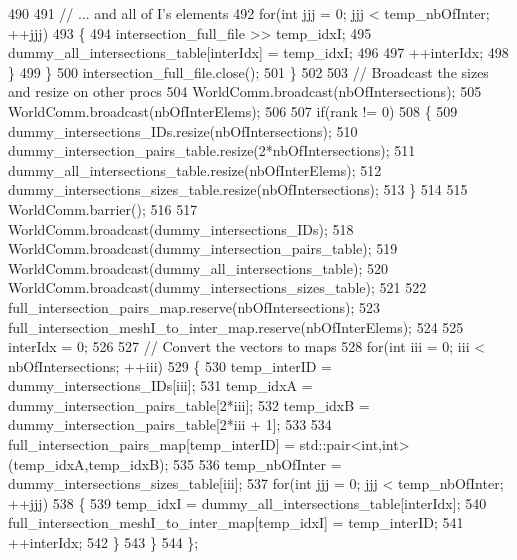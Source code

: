 \begin{DoxyCode}
490 
491             \textcolor{comment}{// ... and all of I's elements}
492             \textcolor{keywordflow}{for}(\textcolor{keywordtype}{int} jjj = 0; jjj < temp\_nbOfInter; ++jjj)
493             \{
494                 intersection\_full\_file >> temp\_idxI;
495                 dummy\_all\_intersections\_table[interIdx] = temp\_idxI;
496 
497                 ++interIdx;
498             \}
499         \}
500         intersection\_full\_file.close();
501     \}
502 
503     \textcolor{comment}{// Broadcast the sizes and resize on other procs}
504     WorldComm.broadcast(nbOfIntersections);
505     WorldComm.broadcast(nbOfInterElems);
506 
507     \textcolor{keywordflow}{if}(rank != 0)
508     \{
509         dummy\_intersections\_IDs.resize(nbOfIntersections);
510         dummy\_intersection\_pairs\_table.resize(2*nbOfIntersections);
511         dummy\_all\_intersections\_table.resize(nbOfInterElems);
512         dummy\_intersections\_sizes\_table.resize(nbOfIntersections);
513     \}
514 
515     WorldComm.barrier();
516 
517     WorldComm.broadcast(dummy\_intersections\_IDs);
518     WorldComm.broadcast(dummy\_intersection\_pairs\_table);
519     WorldComm.broadcast(dummy\_all\_intersections\_table);
520     WorldComm.broadcast(dummy\_intersections\_sizes\_table);
521 
522     full\_intersection\_pairs\_map.reserve(nbOfIntersections);
523     full\_intersection\_meshI\_to\_inter\_map.reserve(nbOfInterElems);
524 
525     interIdx = 0;
526 
527     \textcolor{comment}{// Convert the vectors to maps}
528     \textcolor{keywordflow}{for}(\textcolor{keywordtype}{int} iii = 0; iii < nbOfIntersections; ++iii)
529     \{
530         temp\_interID    = dummy\_intersections\_IDs[iii];
531         temp\_idxA       = dummy\_intersection\_pairs\_table[2*iii];
532         temp\_idxB       = dummy\_intersection\_pairs\_table[2*iii + 1];
533 
534         full\_intersection\_pairs\_map[temp\_interID] = std::pair<int,int>(temp\_idxA,temp\_idxB);
535 
536         temp\_nbOfInter  = dummy\_intersections\_sizes\_table[iii];
537         \textcolor{keywordflow}{for}(\textcolor{keywordtype}{int} jjj = 0; jjj < temp\_nbOfInter; ++jjj)
538         \{
539             temp\_idxI   = dummy\_all\_intersections\_table[interIdx];
540             full\_intersection\_meshI\_to\_inter\_map[temp\_idxI] = temp\_interID;
541             ++interIdx;
542         \}
543     \}
544 \};
\end{DoxyCode}
\hypertarget{namespacecarl_ab4df2c3a7c53c68fc2628569f4b4bd17}{}
